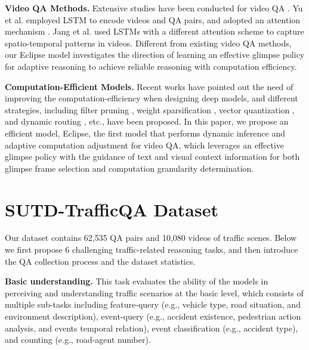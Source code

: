 \documentclass[final]{cvpr}
\begin{document}
\textbf{Video QA Methods.}
Extensive studies have been conducted for video QA \cite{yu2017end,jang2017tgif,garcia2020knowledge,Jiang_2020_CVPR,Kim_2020_CVPR,lei-etal-2020-tvqa,tsai2019GSTEG,li2019beyond,Kim_2018_ECCV,Yu_2018_ECCV,sukhbaatar2015end,wang2018movie,fan2019heterogeneous,liang2018focal,tensoremnlp17,8654010}. 
Yu et al. \cite{yu2017end} employed LSTM to encode videos and QA pairs, and adopted an attention mechanism \cite{you2016image}. 
Jang et al. \cite{jang2017tgif} used LSTMs with a different attention scheme to capture spatio-temporal patterns in videos. 
Different from existing video QA methods, our Eclipse model investigates the direction of learning an effective glimpse policy for adaptive reasoning to achieve reliable reasoning with computation efficiency.

\textbf{Computation-Efficient Models.}
Recent works \cite{Bhardwaj_2019_CVPR,Mu_2019_CVPR,strubell2019energy,figurnov2017spatially, korbar2019scsampler,wu2019adaframe,schwartz2019green,NEURIPS2019_bd853b47, fan2020adaptive} have pointed out the need of improving the computation-efficiency when designing deep models, and 
different strategies, including filter pruning \cite{li2016pruning}, weight sparsification \cite{sun2016sparsifying}, vector quantization \cite{agustsson2017soft}, and dynamic routing \cite{wang2018skipnet}, etc., have been proposed. In this paper, we propose an efficient model, Eclipse, the first model that performs dynamic inference and adaptive computation adjustment for video QA, which leverages an effective glimpse policy with the guidance of text and visual context information for both glimpse frame selection and computation granularity determination.

\section{SUTD-TrafficQA Dataset}\label{section:dataset}

Our dataset contains 62,535 QA pairs and 10,080 videos of traffic scenes. Below we first propose 6 challenging traffic-related reasoning tasks, and then introduce the QA collection process and the dataset statistics. 

{\bf Basic understanding.} This task evaluates the ability of the models in perceiving and understanding traffic scenarios at the basic level, which consists of multiple sub-tasks including feature-query (e.g., vehicle type, road situation, and environment description), event-query (e.g., accident existence, pedestrian action analysis, and events temporal relation), event classification (e.g., accident type), and counting (e.g., road-agent number). 
\end{document}
